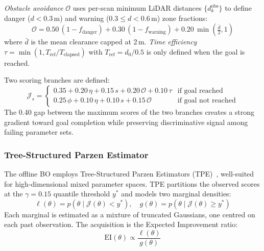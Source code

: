 \documentclass[conference]{IEEEtran}
\begin{document}
\textit{Obstacle avoidance} $\mathcal{O}$ uses per-scan minimum LiDAR distances $\{d_k^{\text{obs}}\}$ to define danger ($d < 0.3\,\text{m}$) and warning ($0.3 \le d < 0.6\,\text{m}$) zone fractions:
\begin{equation}
	\mathcal{O} = 0.50\,(1 - f_{\text{danger}}) + 0.30\,(1 - f_{\text{warning}}) + 0.20\,\min\!\left(\tfrac{\bar{d}}{2}, 1\right)
	\label{eq:obs-score}
\end{equation}
where $\bar{d}$ is the mean clearance capped at 2\,m. \textit{Time efficiency} $\tau = \min(1, T_{\text{ref}}/T_{\text{elapsed}})$ with $T_{\text{ref}} = d_0/0.5$ is only defined when the goal is reached.

Two scoring branches are defined:
\begin{equation}
	\mathcal{J}_s = \begin{cases}
		0.35 + 0.20\,\eta + 0.15\,s + 0.20\,\mathcal{O} + 0.10\,\tau & \text{if goal reached}     \\
		0.25\,\phi + 0.10\,\eta + 0.10\,s + 0.15\,\mathcal{O}        & \text{if goal not reached}
	\end{cases}
	\label{eq:score-branch}
\end{equation}
The 0.40 gap between the maximum scores of the two branches creates a strong gradient toward goal completion while preserving discriminative signal among failing parameter sets.

\subsubsection{Tree-Structured Parzen Estimator}

The offline BO employs Tree-Structured Parzen Estimators (TPE)~\cite{watanabe2025treestructuredparzenestimatorunderstanding}, well-suited for high-dimensional mixed parameter spaces. TPE partitions the observed scores at the $\gamma = 0.15$ quantile threshold $y^*$ and models two marginal densities:
\begin{equation}
	\ell(\theta) = p(\theta \mid \mathcal{J}(\theta) < y^*), \quad g(\theta) = p(\theta \mid \mathcal{J}(\theta) \geq y^*)
	\label{eq:tpe-densities}
\end{equation}
Each marginal is estimated as a mixture of truncated Gaussians, one centred on each past observation. The acquisition is the Expected Improvement ratio:
\begin{equation}
	\text{EI}(\theta) \propto \frac{\ell(\theta)}{g(\theta)}
	\label{eq:tpe-acq}
\end{equation}
\end{document}
